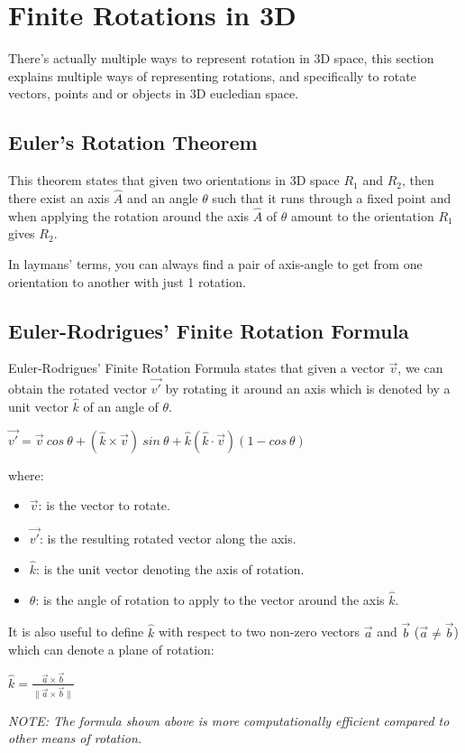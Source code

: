 \section{Finite Rotations in 3D}
There's actually multiple ways to represent rotation in 3D space, this section explains
multiple ways of representing rotations, and specifically to rotate vectors, points and or objects in 3D eucledian space.

\subsection{Euler's Rotation Theorem}
This theorem states that given two orientations in 3D space $R_1$ and $R_2$,
then there exist an axis $\hat{A}$ and an angle $\theta$ such that it runs through a fixed point
and when applying the rotation around the axis $\hat{A}$ of $\theta$ amount to the orientation $R_1$ gives $R_2$.

In laymans' terms, you can always find a pair of axis-angle to get from one orientation to another with just 1 rotation.

\subsection{Euler-Rodrigues' Finite Rotation Formula}
Euler-Rodrigues' Finite Rotation Formula states that given a vector $\vec{v}$, we can
obtain the rotated vector $\vec{v'}$ by rotating it around an axis which is denoted by
a unit vector $\hat{k}$ of an angle of $\theta$.

\begin{center}
    $\vec{v'}=\vec{v}~cos~\theta + (\hat{k} \times \vec{v})~sin~\theta + \hat{k}(\hat{k} \cdot \vec{v})(1 - cos~\theta)$
\end{center}

where:
\begin{itemize}
    \item $\vec{v}$: is the vector to rotate.
    \item $\vec{v'}$: is the resulting rotated vector along the axis.
    \item $\hat{k}$: is the unit vector denoting the axis of rotation.
    \item $\theta$: is the angle of rotation to apply to the vector around the axis $\hat{k}$.
\end{itemize}

It is also useful to define $\hat{k}$ with respect to two non-zero vectors $\vec{a}$ and $\vec{b}$ ($\vec{a} \neq \vec{b}$) which
can denote a plane of rotation:

\begin{center}
    $\hat{k} = \frac{\vec{a} \times \vec{b}}{\|\vec{a} \times \vec{b}\|}$
\end{center}

\vspace{.5em}

\emph{
    NOTE: The formula shown above is more computationally efficient compared to
    other means of rotation.
}
